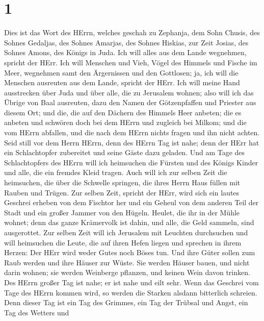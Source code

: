 \hypertarget{section}{%
\section{1}\label{section}}

 Dies ist das Wort des HErrn, welches geschah zu Zephanja,
dem Sohn Chusis, des Sohnes Gedaljas, des Sohnes Amarjas, des Sohnes
Hiskias, zur Zeit Josias, des Sohnes Amons, des Königs in Juda.
 Ich will alles aus dem Lande wegnehmen, spricht der HErr.
 Ich will Menschen und Vieh, Vögel des Himmels und Fische im
Meer, wegnehmen samt den Ärgernissen und den Gottlosen; ja, ich will die
Menschen ausreuten aus dem Lande, spricht der HErr.  Ich
will meine Hand ausstrecken über Juda und über alle, die zu Jerusalem
wohnen; also will ich das Übrige von Baal ausreuten, dazu den Namen der
Götzenpfaffen und Priester aus diesem Ort;  und die, die auf
den Dächern des Himmels Heer anbeten; die es anbeten und schwören doch
bei dem HErrn und zugleich bei Milkom;  und die vom HErrn
abfallen, und die nach dem HErrn nichts fragen und ihn nicht achten.
 Seid still vor dem Herrn HErrn, denn des HErrn Tag ist
nahe; denn der HErr hat ein Schlachtopfer zubereitet und seine Gäste
dazu geladen.  Und am Tage des Schlachtopfers des HErrn will
ich heimsuchen die Fürsten und des Königs Kinder und alle, die ein
fremdes Kleid tragen.  Auch will ich zur selben Zeit die
heimsuchen, die über die Schwelle springen, die ihres Herrn Haus füllen
mit Rauben und Trügen.  Zur selben Zeit, spricht der HErr,
wird sich ein lautes Geschrei erheben von dem Fischtor her und ein
Geheul von dem anderen Teil der Stadt und ein großer Jammer von den
Hügeln.  Heulet, die ihr in der Mühle wohnet; denn das
ganze Krämervolk ist dahin, und alle, die Geld sammeln, sind
ausgerottet.  Zur selben Zeit will ich Jerusalem mit
Leuchten durchsuchen und will heimsuchen die Leute, die auf ihren Hefen
liegen und sprechen in ihrem Herzen: Der HErr wird weder Gutes noch
Böses tun.  Und ihre Güter sollen zum Raub werden und ihre
Häuser zur Wüste. Sie werden Häuser bauen, und nicht darin wohnen; sie
werden Weinberge pflanzen, und keinen Wein davon trinken. 
Des HErrn großer Tag ist nahe; er ist nahe und eilt sehr. Wenn das
Geschrei vom Tage des HErrn kommen wird, so werden die Starken alsdann
bitterlich schreien.  Denn dieser Tag ist ein Tag des
Grimmes, ein Tag der Trübsal und Angst, ein Tag des Wetters und
